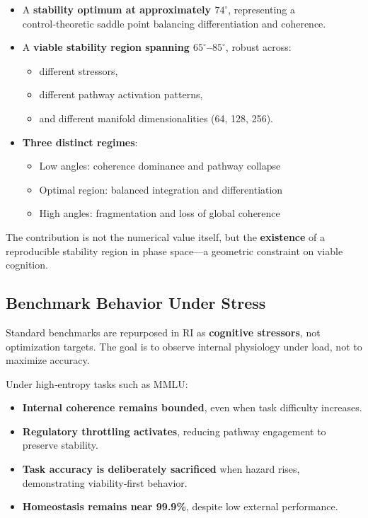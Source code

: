 \documentclass[12pt,a4paper]{report}
\begin{document}
\begin{itemize}
\item A \textbf{stability optimum at approximately $74^\circ$}, representing a control‑theoretic saddle point balancing differentiation and coherence.

\item A \textbf{viable stability region spanning $65^\circ$–$85^\circ$}, robust across:
  \begin{itemize}
  \item different stressors,
  \item different pathway activation patterns,
  \item and different manifold dimensionalities (64, 128, 256).
  \end{itemize}

\item \textbf{Three distinct regimes}:
  \begin{itemize}
  \item Low angles: coherence dominance and pathway collapse
  \item Optimal region: balanced integration and differentiation
  \item High angles: fragmentation and loss of global coherence
  \end{itemize}
\end{itemize}

The contribution is not the numerical value itself, but the \textbf{existence} of a reproducible stability region in phase space—a geometric constraint on viable cognition.

\subsection{Benchmark Behavior Under Stress}

Standard benchmarks are repurposed in RI as \textbf{cognitive stressors}, not optimization targets. The goal is to observe internal physiology under load, not to maximize accuracy.

Under high‑entropy tasks such as MMLU:

\begin{itemize}
\item \textbf{Internal coherence remains bounded}, even when task difficulty increases.
\item \textbf{Regulatory throttling activates}, reducing pathway engagement to preserve stability.
\item \textbf{Task accuracy is deliberately sacrificed} when hazard rises, demonstrating viability‑first behavior.
\item \textbf{Homeostasis remains near 99.9\%}, despite low external performance.
\end{itemize}
\end{document}
